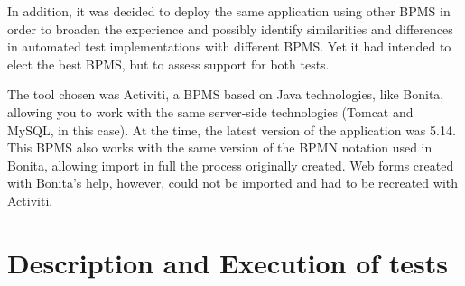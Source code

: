 \documentclass[runningheads,a4paper]{llncs}
\begin{document}
In addition, it was decided to deploy the same application using other BPMS in order to broaden the experience and possibly identify similarities and differences in automated test implementations with different BPMS. Yet it had intended to elect the best BPMS, but to assess support for both tests.

The tool chosen was Activiti, a BPMS based on Java technologies, like Bonita, allowing you to work with the same server-side technologies (Tomcat and MySQL, in this case). At the time, the latest version of the application was 5.14. This BPMS also works with the same version of the BPMN notation used in Bonita, allowing import in full the process originally created. Web forms created with Bonita's help, however, could not be imported and had to be recreated with Activiti.

\section{Description and Execution of tests}\label{s:testes}
\end{document}
